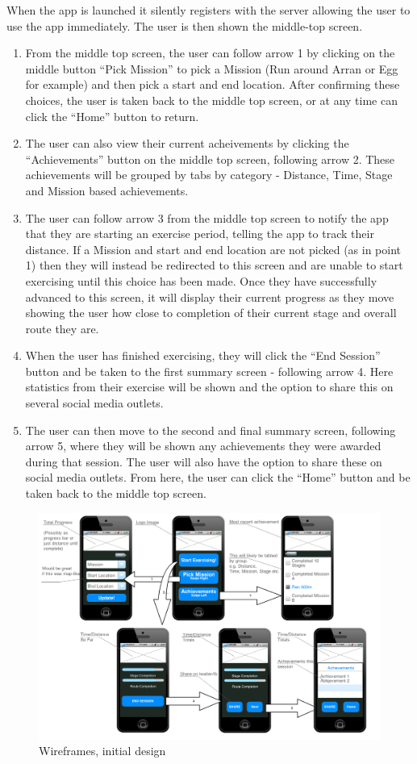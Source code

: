 When the app is launched it silently registers with the server
allowing the user to use the app immediately. The user is then shown
the middle-top screen.
\begin{enumerate}
\item From the middle top screen, the user can follow arrow 1 by
  clicking on the middle button ``Pick Mission'' to pick a Mission
  (Run around Arran or Egg for example) and then pick a start and
  end location. After confirming these choices, the user is taken
  back to the middle top screen, or at any time can click the
  ``Home'' button to return. 
\item The user can also view their current acheivements by clicking
  the ``Achievements'' button on the middle top screen, following
  arrow 2. These achievements will be grouped by tabs by category -
  Distance, Time, Stage and Mission based achievements.
\item The user can follow arrow 3 from the middle top screen to
  notify the app that they are starting an exercise period, telling
  the app to track their distance. If a Mission and start and end
  location are not picked (as in point 1) then they will instead be
  redirected to this screen and are unable to start exercising until
  this choice has been made. Once they have successfully advanced to
  this screen, it will display their current progress as they move
  showing the user how close to completion of their current stage
  and overall route they are. 
\item When the user has finished exercising, they will click the
  ``End Session'' button and be taken to the first summary screen -
  following arrow 4. Here statistics from their exercise will be
  shown and the option to share this on several social media
  outlets.
\item The user can then move to the second and final summary screen,
  following arrow 5, where they will be shown any achievements they
  were awarded during that session. The user will also have the
  option to share these on social media outlets. From here, the user
  can click the ``Home'' button and be taken back to the middle top
  screen. 
\end{enumerate}
\begin{figure}[H]
  \centering
  \includegraphics[width=\linewidth]{images/Wireframes.png}
  \caption{Wireframes, initial design}
  \label{wireframes_1}
\end{figure}

